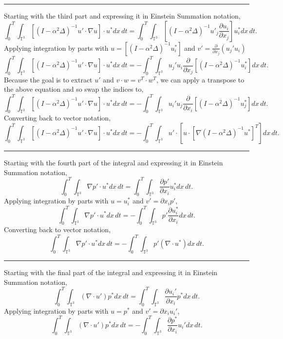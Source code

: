 \documentclass[12pt]{article}
\numberwithin{equation}{section}
\begin{document}
\begin{center}
\noindent\rule{19cm}{0.4pt}
\end{center}
Starting with the third part and expressing it in Einstein Summation notation,
$$\int_0^T\int_{\mathbb{T}^3}\left[(I-\alpha^2\Delta)^{-1}u'\cdot\nabla u\right]\cdot u^* dx\, dt = \int_0^T\int_{\mathbb{T}^3}\left[(I-\alpha^2\Delta)^{-1}u'_{j}\frac{\partial u_i}{\partial x_j}\right]u^*_i dx\, dt.$$
Applying integration by parts with $u=[(I-\alpha^2\Delta)^{-1}u_i^*]$ and $v'= \frac{\partial}{\partial x_j}(u_j' u_i)$
$$\int_0^T\int_{\mathbb{T}^3}\left[(I-\alpha^2\Delta)^{-1}u'\cdot\nabla u\right]\cdot u^* dx\, dt = -\int_0^T\int_{\mathbb{T}^3}u_j'u_i\frac{\partial}{\partial x_j} \left[ (I-\alpha^2\Delta)^{-1} u_i^* \right] dx \,dt.$$
Because the goal is to extract $u'$ and $v\cdot w = v^T \cdot w^T$, we can apply a transpose to the above equation and so swap the indices to,
$$\int_0^T\int_{\mathbb{T}^3}\left[(I-\alpha^2\Delta)^{-1}u'\cdot\nabla u\right]\cdot u^* dx\, dt = -\int_0^T\int_{\mathbb{T}^3}u_i'u_j\frac{\partial}{\partial x_i} \left[ (I-\alpha^2\Delta)^{-1} u_j^* \right] dx \,dt.$$
Converting back to vector notation,
$$\int_0^T\int_{\mathbb{T}^3}\left[(I-\alpha^2\Delta)^{-1}u'\cdot\nabla u\right]\cdot u^* dx\, dt = -\int_0^T\int_{\mathbb{T}^3}u' \cdot \left[ u \cdot \left[ \nabla (I-\alpha^2\Delta)^{-1} u^* \right]^T \right] dx \,dt.$$
\begin{center}
\noindent\rule{19cm}{0.4pt}
\end{center}
Starting with the fourth part of the integral and expressing it in Einstein Summation notation,
$$\int_0^T\int_{\mathbb{T}^3} \nabla p' \cdot u^* dx\,dt= \int_0^T\int_{\mathbb{T}^3} \frac{\partial p'}{\partial x_i}u_i^* dx\,dt.$$
Applying integration by parts with $u=u_i^*$ and $v'=\partial x_i p'$,
$$\int_0^T\int_{\mathbb{T}^3} \nabla p' \cdot u^* dx\,dt= -\int_0^T\int_{\mathbb{T}^3} p'\frac{\partial u_i^*}{\partial x_i} dx\,dt.$$
Converting back to vector notation,
$$\int_0^T\int_{\mathbb{T}^3} \nabla p' \cdot u^* dx\,dt= -\int_0^T\int_{\mathbb{T}^3} p'(\nabla \cdot u^*) dx\,dt.$$
\begin{center}
\noindent\rule{19cm}{0.4pt}
\end{center}
Starting with the final part of the integral and expressing it in Einstein Summation notation,
$$\int_0^T\int_{\mathbb{T}^3}(\nabla \cdot u')p^* dx\,dt = \int_0^T\int_{\mathbb{T}^3} \frac{\partial u_i'}{\partial x_i} p^* dx\,dt.$$
Applying integration by parts with $u=p^*$ and $v'=\partial x_i u_i'$,
$$\int_0^T\int_{\mathbb{T}^3}(\nabla \cdot u')p^* dx\,dt = -\int_0^T\int_{\mathbb{T}^3} \frac{\partial p^*}{\partial x_i} u_i' dx\,dt.$$
\end{document}
